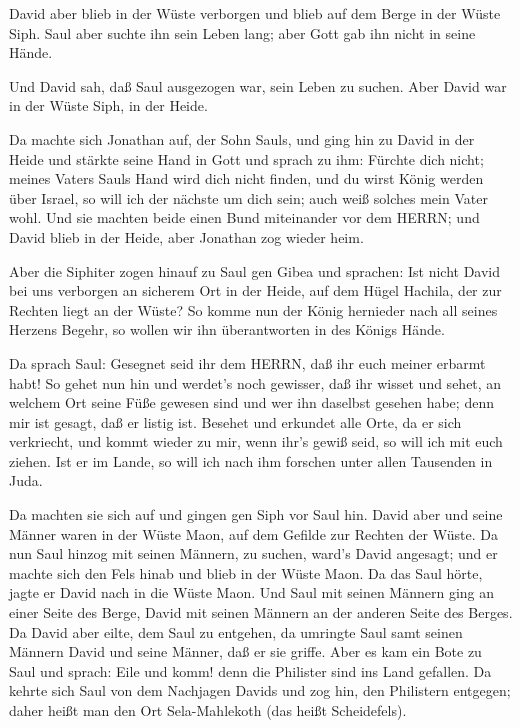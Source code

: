  David aber blieb in der Wüste verborgen und blieb auf dem
Berge in der Wüste Siph. Saul aber suchte ihn sein Leben lang; aber Gott
gab ihn nicht in seine Hände.

 Und David sah, daß Saul ausgezogen war, sein Leben zu
suchen. Aber David war in der Wüste Siph, in der Heide.

 Da machte sich Jonathan auf, der Sohn Sauls, und ging hin
zu David in der Heide und stärkte seine Hand in Gott  und
sprach zu ihm: Fürchte dich nicht; meines Vaters Sauls Hand wird dich
nicht finden, und du wirst König werden über Israel, so will ich der
nächste um dich sein; auch weiß solches mein Vater wohl. 
Und sie machten beide einen Bund miteinander vor dem HERRN; und David
blieb in der Heide, aber Jonathan zog wieder heim.

 Aber die Siphiter zogen hinauf zu Saul gen Gibea und
sprachen: Ist nicht David bei uns verborgen an sicherem Ort in der
Heide, auf dem Hügel Hachila, der zur Rechten liegt an der Wüste?
 So komme nun der König hernieder nach all seines Herzens
Begehr, so wollen wir ihn überantworten in des Königs Hände.

 Da sprach Saul: Gesegnet seid ihr dem HERRN, daß ihr euch
meiner erbarmt habt!  So gehet nun hin und werdet's noch
gewisser, daß ihr wisset und sehet, an welchem Ort seine Füße gewesen
sind und wer ihn daselbst gesehen habe; denn mir ist gesagt, daß er
listig ist.  Besehet und erkundet alle Orte, da er sich
verkriecht, und kommt wieder zu mir, wenn ihr's gewiß seid, so will ich
mit euch ziehen. Ist er im Lande, so will ich nach ihm forschen unter
allen Tausenden in Juda.

 Da machten sie sich auf und gingen gen Siph vor Saul hin.
David aber und seine Männer waren in der Wüste Maon, auf dem Gefilde zur
Rechten der Wüste.  Da nun Saul hinzog mit seinen Männern,
zu suchen, ward's David angesagt; und er machte sich den Fels hinab und
blieb in der Wüste Maon. Da das Saul hörte, jagte er David nach in die
Wüste Maon.  Und Saul mit seinen Männern ging an einer
Seite des Berge, David mit seinen Männern an der anderen Seite des
Berges. Da David aber eilte, dem Saul zu entgehen, da umringte Saul samt
seinen Männern David und seine Männer, daß er sie griffe. 
Aber es kam ein Bote zu Saul und sprach: Eile und komm! denn die
Philister sind ins Land gefallen.  Da kehrte sich Saul von
dem Nachjagen Davids und zog hin, den Philistern entgegen; daher heißt
man den Ort Sela-Mahlekoth (das heißt Scheidefels).

